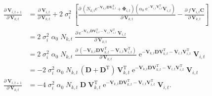 \begin{equation*}
\begin{split}
    \frac{ \partial \: \mathbf{V}_{i,t+1} }{ \partial \: \mathbf{V}_{k,t} } &=
        \frac{ \partial \: \mathbf{V}_{i,t} }{ \partial \: \mathbf{V}_{k,t} } +
        2 \; \sigma_i^2 \;
        \left[
            \frac{ \partial \:
                \left(
                    N_{k,t} \textrm{e}^{- \mathbf{V}_{k,t} \mathbf{D}
                    \mathbf{V}_{k,t}^{\textrm{T}}} + \mathbf{\Phi}_{i,t}
                \right)
                \left(
                    \alpha_0 \; \textrm{e}^{- \mathbf{V}_{i,t}
                    \mathbf{V}_{i,t}^{\textrm{T}}} \mathbf{V}_{i,t}
                \right)
            }{ \partial \:  \mathbf{V}_{k,t} } -
            \frac{ \partial \:  f \, \mathbf{V}_{i,t} \mathbf{C} }{
            \partial \: \mathbf{V}_{k,t} }
        \right] \\
    &= 2 \; \sigma_i^2 \; \alpha_0 \; N_{k,t} \;
        \frac{ \partial \:
                \textrm{e}^{
                    - \mathbf{V}_{k,t} \mathbf{D} \mathbf{V}_{k,t}^{\textrm{T}}
                    - \mathbf{V}_{i,t} \mathbf{V}_{i,t}^{\textrm{T}}
                } \; \mathbf{V}_{i,t}
            }{ \partial \:  \mathbf{V}_{k,t} } \\
    &= 2 \; \sigma_i^2 \; \alpha_0 \; N_{k,t} \;
        \frac{ \partial \:
                \left(
                    - \mathbf{V}_{k,t} \mathbf{D} \mathbf{V}_{k,t}^{\textrm{T}}
                    - \mathbf{V}_{i,t} \mathbf{V}_{i,t}^{\textrm{T}}
                \right)
            }{ \partial \:  \mathbf{V}_{k,t} } \;
        \textrm{e}^{
                    - \mathbf{V}_{k,t} \mathbf{D} \mathbf{V}_{k,t}^{\textrm{T}}
                    - \mathbf{V}_{i,t} \mathbf{V}_{i,t}^{\textrm{T}}
                } \; \mathbf{V}_{i,t} \\
    &= - 2 \; \sigma_i^2 \; \alpha_0 \; N_{k,t} \,
        \left( \mathbf{D} + \mathbf{D}^{\textrm{T}} \right) \,
        \mathbf{V}_{k,t}^{\textrm{T}} \;
        \textrm{e}^{
                    - \mathbf{V}_{k,t} \mathbf{D} \mathbf{V}_{k,t}^{\textrm{T}}
                    - \mathbf{V}_{i,t} \mathbf{V}_{i,t}^{\textrm{T}}
                } \; \mathbf{V}_{i,t} \\[2ex]
    \frac{ \partial \: \mathbf{V}_{i,t+1} }{ \partial \: \mathbf{V}_{k,t}} &=
        -4 \; \sigma_i^2 \; \alpha_0 \; N_{k,t} \;
        \mathbf{D} \; \mathbf{V}_{k,t}^{\textrm{T}} \;
        \textrm{e}^{
                - \mathbf{V}_{k,t} \mathbf{D} \mathbf{V}_{k,t}^{\textrm{T}}
                - \mathbf{V}_{i,t} \mathbf{V}_{i,t}^{\textrm{T}}
            } \;
            \mathbf{V}_{i,t}
    \textrm{.} \\
\end{split}
\end{equation*}



